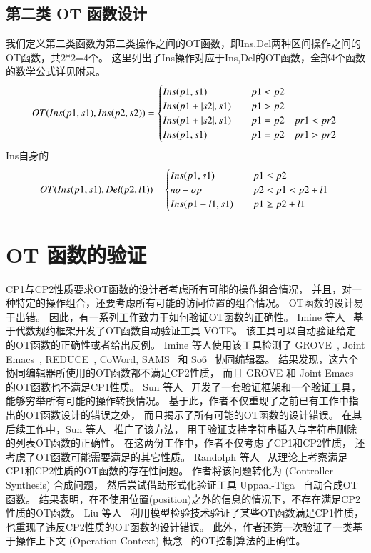 \subsection{第二类 OT 函数设计}
我们定义第二类函数为第二类操作之间的OT函数，即Ins,Del两种区间操作之间的OT函数，共2*2=4个。
这里列出了Ins操作对应于Ins,Del的OT函数，全部4个函数的数学公式详见附录。\cite{Sun:CSCW14}
\begin{equation}
OT(Ins(p1,s1),Ins(p2,s2))= \begin{cases}
Ins(p1,s1) \quad & p1<p2 \\
Ins(p1+ |s2|,s1) \quad & p1>p2 \\
Ins(p1+ |s2|,s1) \quad & p1=p2 \quad pr1<pr2 \\
Ins(p1,s1) \quad & p1=p2 \quad pr1>pr2
 \end{cases}\\
\end{equation}
Ins自身的
\begin{equation}
OT(Ins(p1,s1),Del(p2,l1))= \begin{cases}
Ins(p1,s1) \quad & p1 \le p2 \\
no-op \quad & p2<p1<p2+l1\\
Ins(p1-l1,s1) \quad & p1 \ge p2+l1 \end{cases}\\
\end{equation}

\section{OT 函数的验证}

CP1与CP2性质要求OT函数的设计者考虑所有可能的操作组合情况，
并且，对一种特定的操作组合，还要考虑所有可能的访问位置的组合情况。
OT函数的设计易于出错。
因此，有一系列工作致力于如何验证OT函数的正确性。
Imine 等人~\cite{Imine:TCS06} 基于代数规约框架开发了OT函数自动验证工具 VOTE。
该工具可以自动验证给定的OT函数的正确性或者给出反例。
Imine 等人使用该工具检测了 GROVE~\cite{Ellis:SIGMOD89}, 
Joint Emacs~\cite{Ressel:CSCW96}, REDUCE~\cite{Sun:TOCHI98}, 
CoWord, SAMS~\cite{Molli:CSCW02} 和 So6~\cite{Sun:CSCW04} 协同编辑器。
结果发现，这六个协同编辑器所使用的OT函数都不满足CP2性质，
而且 GROVE 和 Joint Emacs 的OT函数也不满足CP1性质。
Sun 等人~\cite{Sun:CSCW14} 开发了一套验证框架和一个验证工具，
能够穷举所有可能的操作转换情况。
基于此，作者不仅重现了之前已有工作中指出的OT函数设计的错误之处，
而且揭示了所有可能的OT函数的设计错误。
在其后续工作中，Sun 等人~\cite{Sun:CSCW17} 推广了该方法，
用于验证支持字符串插入与字符串删除的列表OT函数的正确性。
在这两份工作中，作者不仅考虑了CP1和CP2性质，
还考虑了OT函数可能需要满足的其它性质。
Randolph 等人~\cite{Randolph:arXiv13} 从理论上考察满足CP1和CP2性质的OT函数的存在性问题。
作者将该问题转化为 (Controller Synthesis) 合成问题，
然后尝试借助形式化验证工具 Uppaal-Tiga~\cite{Cassez:CONCUR05} 自动合成OT函数。
结果表明，在不使用位置(position)之外的信息的情况下，不存在满足CP2性质的OT函数。
Liu 等人~\cite{Liu:FM14} 利用模型检验技术验证了某些OT函数满足CP1性质，
也重现了违反CP2性质的OT函数的设计错误。
此外，作者还第一次验证了一类基于操作上下文 (Operation Context) 概念~\cite{Sun:CSCW06} 的OT控制算法的正确性。